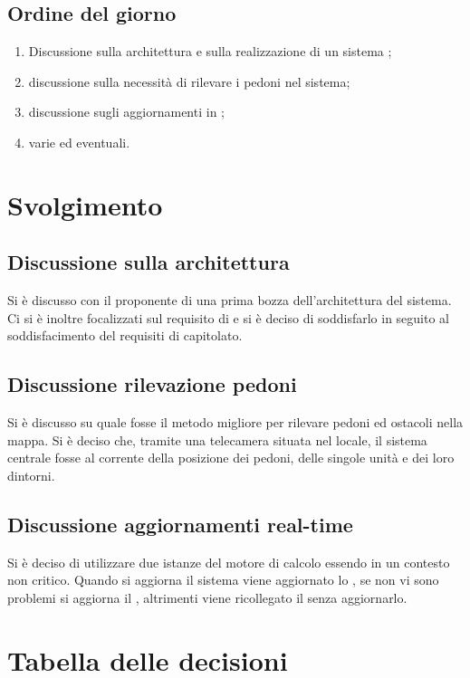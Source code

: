 \documentclass[]{article}
\begin{document}
	\subsection{Ordine del giorno}
	\begin{enumerate}
		\item  Discussione sulla architettura e sulla realizzazione di un sistema ;
		\item  discussione sulla necessità di rilevare i pedoni nel sistema;
		\item  discussione sugli aggiornamenti in ;
		\item  varie ed eventuali.
	\end{enumerate}
	\newpage
	\section{Svolgimento}


	\subsection{Discussione sulla architettura}
	Si è discusso con il proponente di una prima bozza dell'architettura del sistema. Ci si è inoltre focalizzati sul requisito di  e si è deciso di soddisfarlo in seguito al soddisfacimento del requisiti di capitolato. 
	\subsection{Discussione rilevazione pedoni}
	Si è discusso su quale fosse il metodo migliore per rilevare pedoni ed ostacoli nella mappa. Si è deciso che, tramite una telecamera situata nel locale, il sistema centrale fosse al corrente della posizione dei pedoni, delle singole unità e dei loro dintorni. 
	\subsection{Discussione aggiornamenti real-time}
	Si è deciso di utilizzare due istanze del motore di calcolo essendo in un contesto non critico. Quando si aggiorna il sistema viene aggiornato lo , se non vi sono problemi si aggiorna il , altrimenti viene ricollegato il  senza aggiornarlo.
	


	\newpage

	\section{Tabella delle decisioni}
\end{document}
